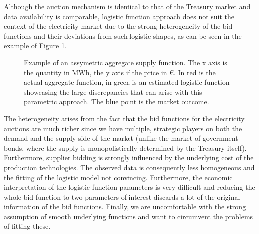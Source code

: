 Although the auction mechanism is identical to that of the Treasury market and data availability is comparable, logistic function approach does not suit the context of the electricity market due to the strong heterogeneity of the bid functions and their deviations from such logistic shapes, as can be seen in the example of Figure \ref{assymetry}. \\

\begin{figure}[!ht]
\begin{center}  \end{center}
\caption{Example of an assymetric aggregate supply function. The x axis is the quantity in MWh, the y axis if the price in €. In red is the actual aggregate function, in green is an estimated logistic function showcasing the large discrepancies that can arise with this parametric approach. The blue point is the market outcome. }
\label{assymetry}
\end{figure}

The heterogeneity arises from the fact that the bid functions for the electricity auctions are much richer since we have multiple, strategic players on both the demand and the supply side of the market (unlike the market of government bonds, where the supply is monopolistically determined by the Treasury itself). Furthermore, supplier bidding is strongly influenced by the underlying cost of the production technologies. The observed data is consequently less homogeneous and the fitting of the logistic model not convincing. Furthermore, the economic interpretation of the logistic function parameters is very difficult and reducing the whole bid function to two parameters of interest discards a lot of the original information of the bid functions. Finally, we are uncomfortable with the strong assumption of smooth underlying functions and want to circumvent the problems of fitting these.\\

